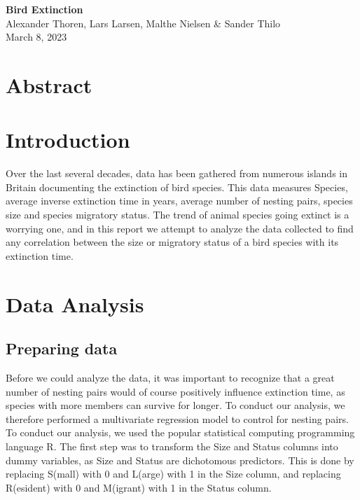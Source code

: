 \documentclass[a4paper, 12pt]{article}
\begin{document}
\thispagestyle{fancy}

\vspace*{0cm}

\begin{center}
    {\LARGE\textbf{Bird Extinction}}\\[1cm]
    {Alexander Thoren, Lars Larsen, Malthe Nielsen \& Sander Thilo}\\[0.4cm]
    {\small March 8, 2023}
\end{center}

\begin{spacing}{1.5}

\section{Abstract}


\section{Introduction}
Over the last several decades, data has been gathered from numerous islands in Britain documenting the extinction of bird species. This data measures Species, average inverse extinction time in years, average number of nesting pairs, species size and species migratory status. The trend of animal species going extinct is a worrying one, and in this report we attempt to analyze the data collected to find any correlation between the size or migratory status of a bird species with its extinction time. 

\section{Data Analysis}
\subsection{Preparing data}
Before we could analyze the data, it was important to recognize that a great number of nesting pairs would of course positively influence extinction time, as species with more members can survive for longer. To conduct our analysis, we therefore performed a multivariate regression model to control for nesting pairs. To conduct our analysis, we used the popular statistical computing programming language R.
The first step was to transform the Size and Status columns into dummy variables, as Size and Status are dichotomous predictors. This is done by replacing S(mall) with 0 and L(arge) with 1 in the Size column, and replacing R(esident) with 0 and M(igrant) with 1 in the Status column.


\end{spacing}
\end{document}

